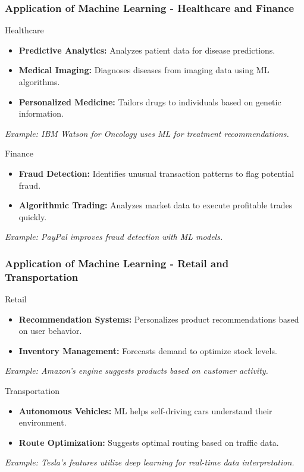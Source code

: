 \documentclass[aspectratio=169]{beamer}
\begin{document}
\begin{frame}[fragile]
    \frametitle{Application of Machine Learning - Healthcare and Finance}
    \begin{block}{Healthcare}
        \begin{itemize}
            \item \textbf{Predictive Analytics:} Analyzes patient data for disease predictions.
            \item \textbf{Medical Imaging:} Diagnoses diseases from imaging data using ML algorithms.
            \item \textbf{Personalized Medicine:} Tailors drugs to individuals based on genetic information.
        \end{itemize}
        \textit{Example: IBM Watson for Oncology uses ML for treatment recommendations.}
    \end{block}

    \begin{block}{Finance}
        \begin{itemize}
            \item \textbf{Fraud Detection:} Identifies unusual transaction patterns to flag potential fraud.
            \item \textbf{Algorithmic Trading:} Analyzes market data to execute profitable trades quickly.
        \end{itemize}
        \textit{Example: PayPal improves fraud detection with ML models.}
    \end{block}
\end{frame}

\begin{frame}[fragile]
    \frametitle{Application of Machine Learning - Retail and Transportation}
    \begin{block}{Retail}
        \begin{itemize}
            \item \textbf{Recommendation Systems:} Personalizes product recommendations based on user behavior.
            \item \textbf{Inventory Management:} Forecasts demand to optimize stock levels.
        \end{itemize}
        \textit{Example: Amazon’s engine suggests products based on customer activity.}
    \end{block}

    \begin{block}{Transportation}
        \begin{itemize}
            \item \textbf{Autonomous Vehicles:} ML helps self-driving cars understand their environment.
            \item \textbf{Route Optimization:} Suggests optimal routing based on traffic data.
        \end{itemize}
        \textit{Example: Tesla’s features utilize deep learning for real-time data interpretation.}
    \end{block}
\end{frame}
\end{document}
